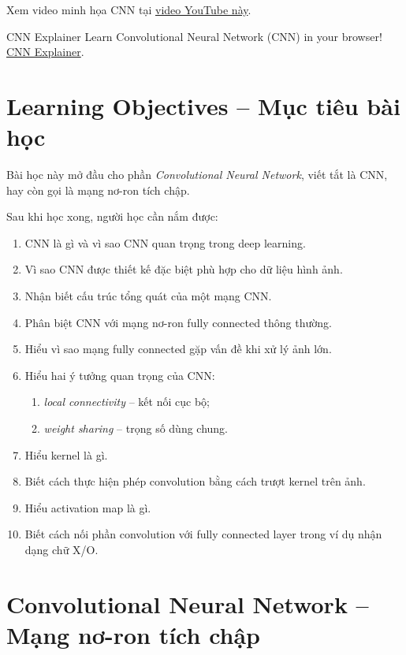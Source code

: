Xem video minh họa CNN tại \href{https://www.youtube.com/watch?v=S3d_Hp3UiJI}{video YouTube này}.

CNN Explainer
Learn Convolutional Neural Network (CNN) in your browser! \href{https://poloclub.github.io/cnn-explainer/}{CNN Explainer}.

\section*{Learning Objectives -- Mục tiêu bài học}

Bài học này mở đầu cho phần \textit{Convolutional Neural Network}, viết tắt là CNN, hay còn gọi là mạng nơ-ron tích chập.

Sau khi học xong, người học cần nắm được:

\begin{enumerate}[label=\arabic*.]
    \item CNN là gì và vì sao CNN quan trọng trong deep learning.
    \item Vì sao CNN được thiết kế đặc biệt phù hợp cho dữ liệu hình ảnh.
    \item Nhận biết cấu trúc tổng quát của một mạng CNN.
    \item Phân biệt CNN với mạng nơ-ron fully connected thông thường.
    \item Hiểu vì sao mạng fully connected gặp vấn đề khi xử lý ảnh lớn.
    \item Hiểu hai ý tưởng quan trọng của CNN:
    \begin{enumerate}
        \item \textit{local connectivity} -- kết nối cục bộ;
        \item \textit{weight sharing} -- trọng số dùng chung.
    \end{enumerate}
    \item Hiểu kernel là gì.
    \item Biết cách thực hiện phép convolution bằng cách trượt kernel trên ảnh.
    \item Hiểu activation map là gì.
    \item Biết cách nối phần convolution với fully connected layer trong ví dụ nhận dạng chữ X/O.
\end{enumerate}

\section{Convolutional Neural Network -- Mạng nơ-ron tích chập}

